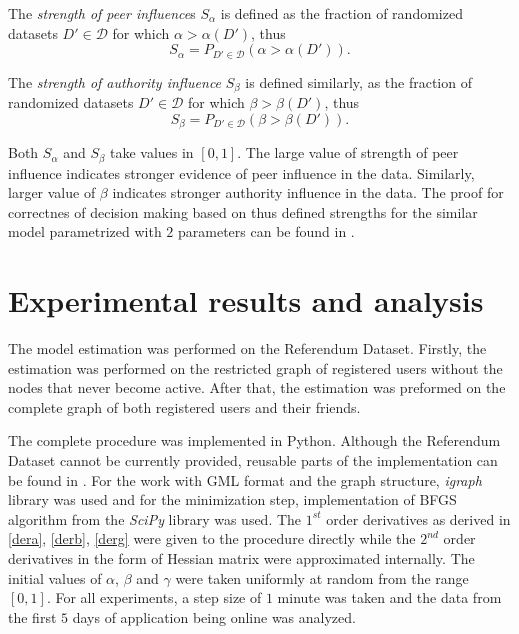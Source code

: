 \documentclass[times, utf8, zavrsni]{fer}
\begin{document}
The \emph{strength of peer influence}s $S_{\alpha}$ is defined as the fraction of randomized datasets $D' \in \mathcal{D}$ for which $\alpha > \alpha(D')$, thus
\begin{equation}
S_{\alpha} = P_{D' \in \mathcal{D}} (\alpha > \alpha(D')).
\end{equation}

The \emph{strength of authority influence} $S_{\beta}$ is defined similarly, as the fraction of randomized datasets $D' \in \mathcal{D}$ for which $\beta > \beta(D')$, thus
\begin{equation}
S_{\beta} = P_{D' \in \mathcal{D}} (\beta > \beta(D')).
\end{equation}

 Both $S_{\alpha}$ and $S_{\beta}$ take values in $[0, 1]$. The large value of strength of peer influence indicates stronger  evidence of peer influence in the data. Similarly, larger value of $\beta$ indicates stronger authority influence in the data. The proof for correctnes of decision making based on thus defined strengths for the similar model parametrized with $2$ parameters can be found in \cite{akm-icsn-kdd08}.

\chapter{Experimental results and analysis}

The model estimation was performed on the Referendum Dataset. Firstly, the estimation was performed on the restricted graph of registered users without the nodes that never become active. After  that, the estimation was preformed on the complete graph of both registered users and their friends.

The complete procedure was implemented in Python. Although the Referendum Dataset cannot be currently provided, reusable parts of the implementation can be found in \cite{code}. For the work with GML \cite{gml} format and the graph structure,  \emph{igraph} library \cite{igraph} was used and for the minimization step, implementation of BFGS algorithm from the \emph{SciPy} library \cite{scipy} was used. The $1^{st}$ order derivatives as derived in \eqref{dera}, \eqref{derb}, \eqref{derg}  were given to the procedure directly while the $2^{nd}$ order derivatives in the form of Hessian matrix were approximated internally. The initial values of $\alpha$, $\beta$ and $\gamma$ were taken uniformly at random from the range $[0, 1]$. For all experiments, a step size of $1$ minute was taken and the data from the first $5$  days of application being online was analyzed.
\end{document}
